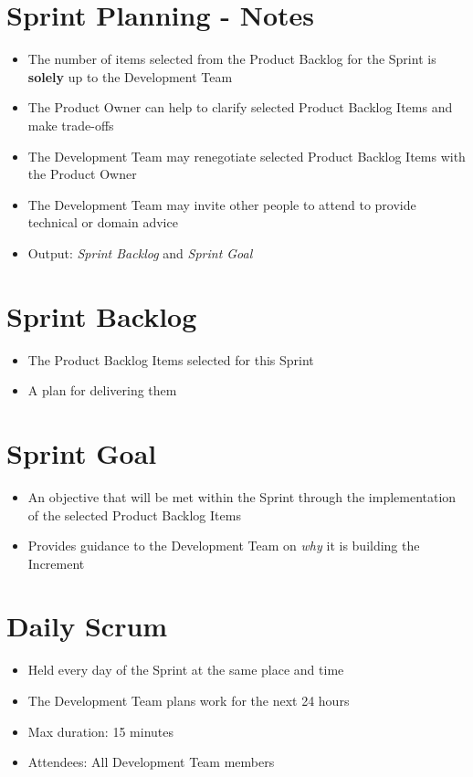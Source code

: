 \documentclass[a4paper,11pt,twocolumn]{article}
\begin{document}
\section*{Sprint Planning - Notes}
\begin{itemize}
    \item The number of items selected from the Product Backlog for the Sprint is \textbf{solely} up to the Development Team
	\item The Product Owner can help to clarify selected Product Backlog Items and make trade-offs
	\item The Development Team may renegotiate selected Product Backlog Items with the Product Owner
	\item The Development Team may invite other people to attend to provide technical or domain advice
	\item Output: \textit{Sprint Backlog} and \textit{Sprint Goal}
\end{itemize}

\section*{Sprint Backlog}
\begin{itemize}
    \item The Product Backlog Items selected for this Sprint
    \item A plan for delivering them
\end{itemize}

\section*{Sprint Goal}
\begin{itemize}
    \item An objective that will be met within the Sprint through the implementation of the selected Product Backlog Items
    \item Provides guidance to the Development Team on \textit{why} it is building the Increment
\end{itemize}

\section*{Daily Scrum}
\begin{itemize}
    \item Held every day of the Sprint at the same place and time
    \item The Development Team plans work for the next 24 hours
	\item Max duration: 15 minutes
	\item Attendees: All Development Team members
\end{itemize}
\end{document}
